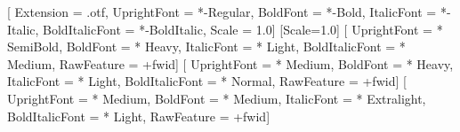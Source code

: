 \makeatletter


\setmainfont{LibertinusSerif}[%
  Extension      = .otf,
  UprightFont    = *-Regular,
  BoldFont       = *-Bold,
  ItalicFont     = *-Italic,
  BoldItalicFont = *-BoldItalic,
  Scale          = 1.0]
\setmonofont{Iosevka}[Scale=1.0]%
[ %
  UprightFont     = * SemiBold,
  BoldFont        = * Heavy,
  ItalicFont      = * Light,
  BoldItalicFont  = * Medium,
  RawFeature      = +fwid]
[ %
  UprightFont     = * Medium,
  BoldFont        = * Heavy,
  ItalicFont      = * Light,
  BoldItalicFont  = * Normal,
  RawFeature      = +fwid]  
[%
  UprightFont     = * Medium,
  BoldFont        = * Medium,
  ItalicFont      = * Extralight,
  BoldItalicFont  = * Light,
  RawFeature      = +fwid]   

